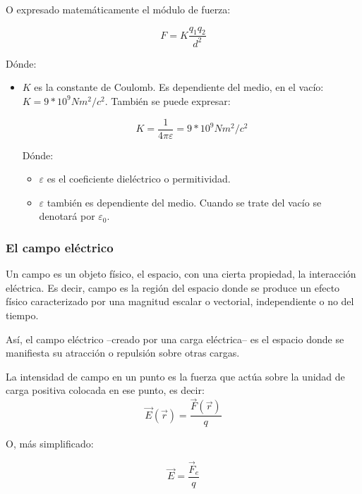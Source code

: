 \documentclass[11pt, oneside, titlepage]{article}
\begin{document}
O expresado matemáticamente el módulo de fuerza:

\[
F = K \frac{q_1 q_2}{d^2} 
\]

Dónde:

\begin{itemize}
\item $K$ es la constante de Coulomb. Es dependiente del medio, en el vacío: $K =  9*10^9 Nm^2/c^2$. También se puede expresar:

\[
K = \frac{1}{4 \pi \varepsilon} = 9*10^9 Nm^2/c^2
\]

Dónde:
\begin{itemize}
\item $\varepsilon$ es el coeficiente dieléctrico o permitividad.
\item $\varepsilon$ también es dependiente del medio. Cuando se trate del vacío se denotará por $\varepsilon_0$.
\end{itemize}
\end{itemize}

\subsubsection{El campo eléctrico}
Un campo es un objeto físico, el espacio, con una cierta propiedad, la interacción eléctrica. Es decir, campo es la región del espacio donde se produce un efecto físico caracterizado por una magnitud escalar o vectorial, independiente o no del tiempo.

Así, el campo eléctrico --creado por una carga eléctrica-- es el espacio donde se manifiesta su atracción o repulsión sobre otras cargas.

La intensidad de campo en un punto es la fuerza que actúa sobre la unidad de carga positiva colocada en ese punto, es decir:
\[
\overrightarrow{E}(\overrightarrow{r}) = \frac{\overrightarrow{F}(\overrightarrow{r})}{q}
\]

O, más simplificado:

\[
\overrightarrow{E} = \frac{\overrightarrow{F}_e}{q}
\]
\end{document}
